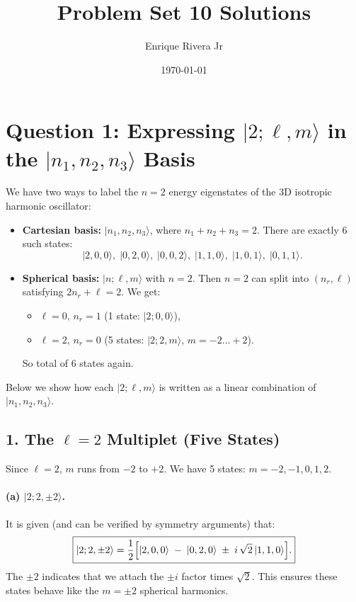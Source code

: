 \documentclass[12pt]{article}
\begin{document}
\title{Problem Set 10 Solutions}
\author{Enrique Rivera Jr}
\date{\today}

\maketitle



\section*{Question 1: Expressing $|2; \ell,m\rangle$ in the $|n_1,n_2,n_3\rangle$ Basis}

We have two ways to label the $n=2$ energy eigenstates of the 3D isotropic harmonic oscillator:
\begin{itemize}
  \item \textbf{Cartesian basis:} $|n_1,n_2,n_3\rangle$, where $n_1+n_2+n_3=2$. There are exactly 6 such states:
  \begin{equation*}
    |2,0,0\rangle,\;|0,2,0\rangle,\;|0,0,2\rangle,\;|1,1,0\rangle,\;|1,0,1\rangle,\;|0,1,1\rangle.
  \end{equation*}
  \item \textbf{Spherical basis:} $|n;\ell,m\rangle$ with $n=2$. Then $n=2$ can split into $(n_r,\ell)$ satisfying $2n_r+\ell=2$. We get:
  \begin{itemize}
    \item $\ell=0,\,n_r=1$ (1 state: $|2;0,0\rangle$),
    \item $\ell=2,\,n_r=0$ (5 states: $|2;2,m\rangle$, $m=-2\dots+2$).
  \end{itemize}
  So total of 6 states again.
\end{itemize}

Below we show how each $|2;\ell,m\rangle$ is written as a linear combination of $|n_1,n_2,n_3\rangle$.

\subsection*{1. The $\ell=2$ Multiplet (Five States)}
Since $\ell=2$, $m$ runs from $-2$ to $+2$. We have 5 states: $m=-2,-1,0,1,2$.

\paragraph{(a) $|2;2,\pm2\rangle$.}
It is given (and can be verified by symmetry arguments) that:
\[
\boxed{
|2;2,\pm 2\rangle
= \frac{1}{2}\Bigl[|2,0,0\rangle \;-\; |0,2,0\rangle \;\pm\; i\,\sqrt{2}\,|1,1,0\rangle\Bigr].
}
\]
The $\pm2$ indicates that we attach the $\pm i$ factor times $\sqrt{2}$. This ensures these states behave like the $m=\pm2$ spherical harmonics.
\end{document}
